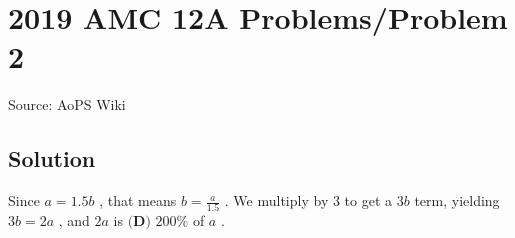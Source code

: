 \documentclass[12pt]{article}
\begin{document}
\section*{{2019 AMC 12A Problems/Problem 2}}
Source: AoPS Wiki

\subsection*{Solution}
Since $a=1.5b$ , that means $b=\frac{a}{1.5}$ . We multiply by $3$ to get a $3b$ term, yielding $3b=2a$ , and $2a$ is $\boxed{\textbf{(D) }200\%}$ of $a$ .
\end{document}

